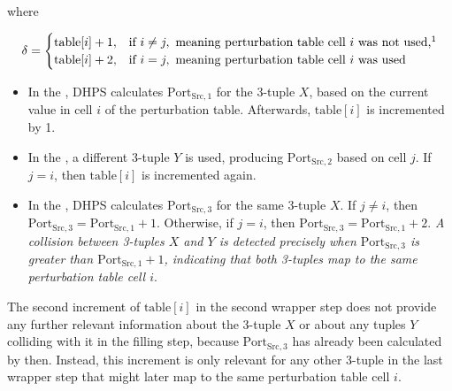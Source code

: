 \documentclass[twocolumn]{report}
\begin{document}
where
\vspace{-1cm}
\begin{center}
	\begin{adjustbox}{max width=\columnwidth}
		\begin{minipage}[t]{0.46\textwidth}
			\[
				\delta =
				\begin{cases}
					\text{table}[i] + 1, & \text{if } i \neq j,\ \text{meaning perturbation table cell } i \text{ was not used,}\footnote{\tiny Used or not used in the filling step.} \\
					\text{table}[i] + 2, & \text{if } i = j,\ \text{meaning perturbation table cell } i \text{ was used}
				\end{cases}
			\]
		\end{minipage}
	\end{adjustbox}
\end{center}
\begin{itemize}
	\item In the , DHPS calculates \(\text{Port}_{\text{Src},1}\) for the 3-tuple \( X \), based on the current value in cell \( i \) of the perturbation table. Afterwards, \(\text{table}[i]\) is incremented by 1.
	\item In the , a different 3-tuple \( Y \) is used, producing \(\text{Port}_{\text{Src},2}\) based on cell \( j \). If \( j = i \), then \(\text{table}[i]\) is incremented again.
	\item In the , DHPS calculates \(\text{Port}_{\text{Src},3}\) for the same 3-tuple \( X \). If \( j \neq i \), then \(\text{Port}_{\text{Src},3} = \text{Port}_{\text{Src},1} + 1\). Otherwise, if \( j = i \), then \(\text{Port}_{\text{Src},3} = \text{Port}_{\text{Src},1} + 2\). \textit{A collision between 3-tuples \( X \) and \( Y \) is detected precisely when \(\text{Port}_{\text{Src},3}\) is greater than \(\text{Port}_{\text{Src},1} + 1\), indicating that both 3-tuples map to the same perturbation table cell \( i \)}.
\end{itemize}

The second increment of \(\text{table}[i]\) in the second wrapper step does \alert{not provide any further relevant information} about the 3-tuple \( X \) or about any tuples \( Y \) colliding with it in the filling step, because \(\text{Port}_{\text{Src},3}\) has already been calculated by then. Instead, this increment is only relevant for any other 3-tuple in the last wrapper step that might later map to the same perturbation table cell \( i \).
\end{document}

